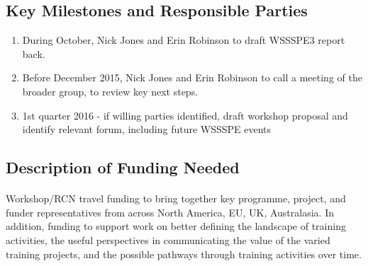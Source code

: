 \subsection{Key Milestones and Responsible Parties}
\begin{enumerate}
    \item During October, Nick Jones and Erin Robinson to draft WSSSPE3 report back. 
    \item Before December 2015, Nick Jones and Erin Robinson to call a meeting of the broader group, to review key next steps. 
    \item 1st quarter 2016 - if willing parties identified, draft workshop proposal and identify relevant forum, including future WSSSPE events
\end{enumerate}

\subsection{Description of Funding Needed}
\paragraph{}
Workshop/RCN travel funding to bring together key programme, project, and funder representatives from across North America, EU, UK, Australasia. In addition, funding to support work on better defining the landscape of training activities, the useful perspectives in communicating the value of the varied training projects, and the possible pathways through training activities over time.
